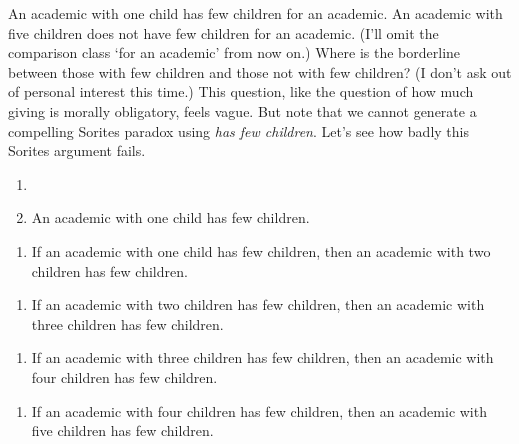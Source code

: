 \documentclass[
  10pt,
  letterpaper,
  DIV=11,
  numbers=noendperiod,
  twoside]{scrartcl}
\providecommand{\tightlist}{%
  \setlength{\itemsep}{0pt}\setlength{\parskip}{0pt}}\usepackage{longtable,booktabs,array}
\begin{document}
An academic with one child has few children for an academic. An academic
with five children does not have few children for an academic. (I'll
omit the comparison class `for an academic' from now on.) Where is the
borderline between those with few children and those not with few
children? (I don't ask out of personal interest this time.) This
question, like the question of how much giving is morally obligatory,
feels vague. But note that we cannot generate a compelling Sorites
paradox using \emph{has few children}. Let's see how badly this Sorites
argument fails.

\begin{description}
\tightlist
\item[(2)]
\begin{enumerate}
\def\labelenumi{(\alph{enumi})}
\tightlist
\item[]
\item
  An academic with one child has few children.
\end{enumerate}

\begin{enumerate}
\def\labelenumi{(\alph{enumi})}
\setcounter{enumi}{1}
\tightlist
\item
  If an academic with one child has few children, then an academic with
  two children has few children.
\end{enumerate}

\begin{enumerate}
\def\labelenumi{(\alph{enumi})}
\setcounter{enumi}{2}
\tightlist
\item
  If an academic with two children has few children, then an academic
  with three children has few children.
\end{enumerate}

\begin{enumerate}
\def\labelenumi{(\alph{enumi})}
\setcounter{enumi}{3}
\tightlist
\item
  If an academic with three children has few children, then an academic
  with four children has few children.
\end{enumerate}

\begin{enumerate}
\def\labelenumi{(\alph{enumi})}
\setcounter{enumi}{4}
\tightlist
\item
  If an academic with four children has few children, then an academic
  with five children has few children.
\end{enumerate}
\end{description}
\end{document}
